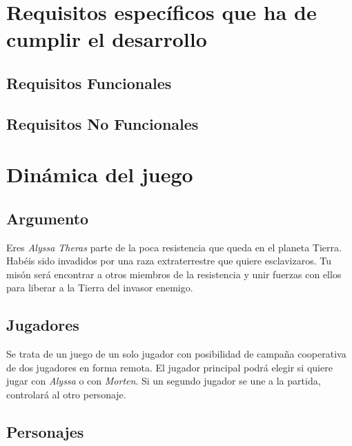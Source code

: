 \documentclass[11pt, twoside]{article}
\begin{document}
\pagestyle{insection}
\section{Requisitos específicos que ha de \\ cumplir el desarrollo}

\subsection{Requisitos Funcionales}


\subsection{Requisitos No Funcionales}

\pagestyle{insection}
\section{Dinámica del juego}


\subsection{Argumento}
Eres \textit{Alyssa Theras} parte de la poca resistencia que queda en el planeta Tierra. Habéis sido invadidos por una raza extraterrestre que quiere esclavizaros. Tu misón será encontrar a otros miembros de la resistencia y unir fuerzas con ellos para liberar a la Tierra del invasor enemigo. 

\subsection{Jugadores}
Se trata de un juego de un solo jugador con posibilidad de campaña cooperativa de dos jugadores en forma remota. El jugador principal podrá elegir si quiere jugar con \textit{Alyssa} o con \textit{Morten}. Si un segundo jugador se une a la partida, controlará al otro personaje.

\pagestyle{insection}
\subsection{Personajes}
\end{document}
